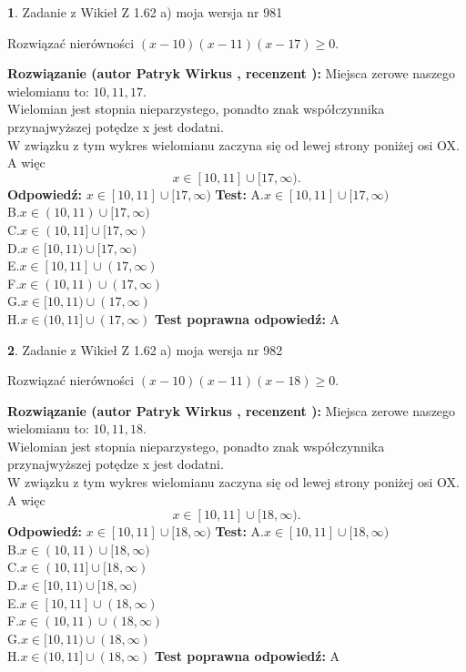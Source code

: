 \documentclass[12pt, a4paper]{article}
\theoremstyle{definition} %
\newtheorem{zad}{}
\newcommand{\zadStart}[1]{\begin{zad}#1\newline}
\newcommand{\zadStop}{\end{zad}}
\newcommand{\rozwStart}[2]{\noindent \textbf{Rozwiązanie (autor #1 , recenzent #2): }\newline}
\newcommand{\rozwStop}{\newline}
\newcommand{\odpStart}{\noindent \textbf{Odpowiedź:}\newline}
\newcommand{\odpStop}{\newline}
\newcommand{\testStart}{\noindent \textbf{Test:}\newline}
\newcommand{\testStop}{\newline}
\newcommand{\kluczStart}{\noindent \textbf{Test poprawna odpowiedź:}\newline}
\newcommand{\kluczStop}{\newline}
\begin{document}
\zadStart{Zadanie z Wikieł Z 1.62 a) moja wersja nr 981}

Rozwiązać nierówności $(x-10)(x-11)(x-17)\ge0$.
\zadStop
\rozwStart{Patryk Wirkus}{}
Miejsca zerowe naszego wielomianu to: $10, 11, 17$.\\
Wielomian jest stopnia nieparzystego, ponadto znak współczynnika przy\linebreak najwyższej potędze x jest dodatni.\\ W związku z tym wykres wielomianu zaczyna się od lewej strony poniżej osi OX. A więc $$x \in [10,11] \cup [17,\infty).$$
\rozwStop
\odpStart
$x \in [10,11] \cup [17,\infty)$
\odpStop
\testStart
A.$x \in [10,11] \cup [17,\infty)$\\
B.$x \in (10,11) \cup [17,\infty)$\\
C.$x \in (10,11] \cup [17,\infty)$\\
D.$x \in [10,11) \cup [17,\infty)$\\
E.$x \in [10,11] \cup (17,\infty)$\\
F.$x \in (10,11) \cup (17,\infty)$\\
G.$x \in [10,11) \cup (17,\infty)$\\
H.$x \in (10,11] \cup (17,\infty)$
\testStop
\kluczStart
A
\kluczStop



\zadStart{Zadanie z Wikieł Z 1.62 a) moja wersja nr 982}

Rozwiązać nierówności $(x-10)(x-11)(x-18)\ge0$.
\zadStop
\rozwStart{Patryk Wirkus}{}
Miejsca zerowe naszego wielomianu to: $10, 11, 18$.\\
Wielomian jest stopnia nieparzystego, ponadto znak współczynnika przy\linebreak najwyższej potędze x jest dodatni.\\ W związku z tym wykres wielomianu zaczyna się od lewej strony poniżej osi OX. A więc $$x \in [10,11] \cup [18,\infty).$$
\rozwStop
\odpStart
$x \in [10,11] \cup [18,\infty)$
\odpStop
\testStart
A.$x \in [10,11] \cup [18,\infty)$\\
B.$x \in (10,11) \cup [18,\infty)$\\
C.$x \in (10,11] \cup [18,\infty)$\\
D.$x \in [10,11) \cup [18,\infty)$\\
E.$x \in [10,11] \cup (18,\infty)$\\
F.$x \in (10,11) \cup (18,\infty)$\\
G.$x \in [10,11) \cup (18,\infty)$\\
H.$x \in (10,11] \cup (18,\infty)$
\testStop
\kluczStart
A
\kluczStop
\end{document}
